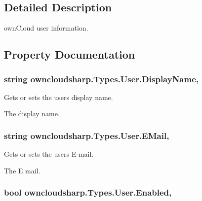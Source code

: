 \subsection{Detailed Description}
own\+Cloud user information. 



\subsection{Property Documentation}
\hypertarget{classowncloudsharp_1_1_types_1_1_user_a9b885e34f7c1e695e5d9867931b64d9c}{}
\subsubsection[{Display\+Name}]{\setlength{\rightskip}{0pt plus 5cm}string owncloudsharp.\+Types.\+User.\+Display\+Name\hspace{0.3cm}{\ttfamily [get]}, {\ttfamily [set]}}\label{classowncloudsharp_1_1_types_1_1_user_a9b885e34f7c1e695e5d9867931b64d9c}


Gets or sets the users display name. 

The display name.\hypertarget{classowncloudsharp_1_1_types_1_1_user_a0097e87f516a0b813b3d893dfaaadafe}{}
\subsubsection[{E\+Mail}]{\setlength{\rightskip}{0pt plus 5cm}string owncloudsharp.\+Types.\+User.\+E\+Mail\hspace{0.3cm}{\ttfamily [get]}, {\ttfamily [set]}}\label{classowncloudsharp_1_1_types_1_1_user_a0097e87f516a0b813b3d893dfaaadafe}


Gets or sets the users E-\/mail. 

The E mail.\hypertarget{classowncloudsharp_1_1_types_1_1_user_a904f26790c73cbc0c6160ed46b160fbd}{}
\subsubsection[{Enabled}]{\setlength{\rightskip}{0pt plus 5cm}bool owncloudsharp.\+Types.\+User.\+Enabled\hspace{0.3cm}{\ttfamily [get]}, {\ttfamily [set]}}\label{classowncloudsharp_1_1_types_1_1_user_a904f26790c73cbc0c6160ed46b160fbd}


